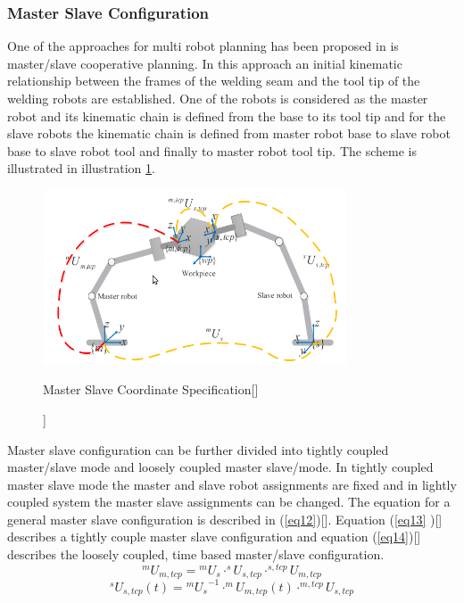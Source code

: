 \subsubsection{Master Slave Configuration}
One of the approaches for multi robot planning has been proposed in \citet{Zhou2016} is master/slave cooperative planning. In this approach an initial kinematic relationship between the frames of the welding seam and the tool tip of the welding robots are established. One of the robots is considered as the master robot and its kinematic chain is defined from the base to its tool tip and for the slave robots the kinematic chain is defined from master robot base to slave robot base to slave robot tool and finally to master robot tool tip. The scheme is illustrated in illustration \ref{fig:img5}.
\begin{figure}[htbp] %
 \centering
   \includegraphics[width=9cm]{images/master_slave_coord.png}
   \caption[Master Slave Coordinate Specification[\citet{Zhou2016}]]
   {Master Slave Coordinate Specification[\citet{Zhou2016}]}  
\label{fig:img5}
\end{figure}
Master slave configuration can be further divided into tightly coupled master/slave mode and loosely coupled master slave/mode. In tightly coupled master slave mode the master and slave robot assignments are fixed and in lightly coupled system the master slave assignments can be changed. 
The equation for a general master slave configuration is described in (\eqref{eq12})[\citet{Zhou2016}]. Equation (\eqref{eq13} )[\citet{Zhou2016}] describes a tightly couple master slave configuration and equation (\eqref{eq14})[\citet{Zhou2016}] describes the loosely coupled, time based master/slave configuration.
\begin{equation}
\label{eq12}
^{m}U_{m,tcp} = {^{m}U_{s}} \cdot ^{s}U_{s,tcp}\cdot^{s,tcp}U_{m,tcp}
\end{equation}
\begin{equation}
\label{eq13}
^{s}U_{s,tcp}(t) = {^{m}U_{s}}^{-1} \cdot ^{m}U_{m,tcp}(t)\cdot^{m,tcp}U_{s,tcp}
\end{equation}
